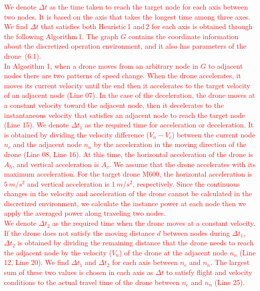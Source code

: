 \documentclass[onecolumn]{IEEEconf}
\begin{document}
\begin{description}
\begin{mdframed} [ linewidth=.75pt, userdefinedwidth=0.9\textwidth]
\begin{itemize}
    \end{itemize}
    \textcolor{red}{We denote $\Delta t$ as the time taken to reach the target node for each axis between two nodes. It is based on the axis that takes the longest time among three axes. We find $\Delta t$ that satisfies both Heuristic\,1 and\,2 for each axis is obtained through the following Algorithm\,1. 
    The graph $G$ contains the coordinate information about the discretized operation environment, and it also has parameters of the drone~(6.1).}~\\
    \textcolor{red}{In Algorithm 1, when a drone moves from an arbitrary node in $G$ to adjacent nodes there are two patterns of speed change. When the drone accelerates, it moves its current velocity until the end then it accelerates to the target velocity of an adjacent node (Line 07). 
    In the case of the deceleration, the drone moves at a constant velocity toward the adjacent node, then it decelerates to the instantaneous velocity that satisfies an adjacent node to reach the target node (Line 15).
    We denote $\Delta t_1$ as the required time for acceleration or deceleration. It is obtained by dividing the velocity difference ($V_n - V_c$) between the current node $n_c$ and the adjacent node $n_n$ by the acceleration in the moving direction of the drone (Line 08, Line 16).
    At this time, the horizontal acceleration of the drone is $A_h$, and vertical acceleration is $A_v$. We assume that the drone accelerates with its maximum acceleration. For the target drone M600, the horizontal acceleration is $5~m/s^2$ and vertical acceleration is $1~m/s^2$, respectively.
    Since the continuous changes in the velocity and acceleration of the drone cannot be calculated in the discretized environment, we calculate the instance power at each node then we apply the averaged power along traveling two nodes.
    }~\\
    \textcolor{red}{
    We denote $\Delta t_2$ as the required time when the drone moves at a constant velocity. 
    If the drone does not satisfy the moving distance $d$ between nodes during $\Delta t_1$, $\Delta t_2$ is obtained by dividing the remaining distance that the drone needs to reach the adjacent node by the velocity ($V_n$) of the drone at the adjacent node $n_n$ (Line 12, Line 20).
    We find $\Delta t_1$ and $\Delta t_2$ for each axis between $n_c$ and $n_n$. The largest sum of these two values is chosen in each axis as $\Delta t$  to satisfy flight and velocity conditions to the actual travel time of the drone between $n_c$ and $n_n$ (Line 25).
}
\end{mdframed}
\end{description}
\end{document}
